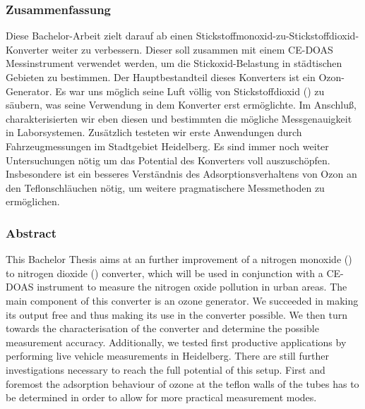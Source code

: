
\subsubsection*{Zusammenfassung}
\label{sec:Zusammenfassung}

Diese Bachelor-Arbeit zielt darauf ab einen
Stickstoffmonoxid-zu-Stickstoffdioxid-Konverter weiter zu
verbessern. Dieser soll zusammen mit einem CE-DOAS Messinstrument
verwendet werden, um die Stickoxid-Belastung in städtischen Gebieten
zu bestimmen. Der Hauptbestandteil dieses Konverters ist ein
Ozon-Generator. Es war uns möglich seine Luft völlig von
Stickstoffdioxid () zu säubern, was seine Verwendung in dem
Konverter erst ermöglichte. Im Anschluß, charakterisierten wir eben
diesen und bestimmten die mögliche  Messgenauigkeit in
Laborsystemen. Zusätzlich testeten wir erste Anwendungen durch
Fahrzeugmessungen im Stadtgebiet Heidelberg. Es sind immer noch weiter
Untersuchungen nötig um das Potential des Konverters voll
auszuschöpfen. Insbesondere ist ein besseres Verständnis des
Adsorptionsverhaltens von Ozon an den Teflonschläuchen nötig, um
weitere pragmatischere Messmethoden zu ermöglichen.


\subsubsection*{Abstract}
\label{sec:abstract}

This Bachelor Thesis aims at an further improvement of a nitrogen
monoxide () to nitrogen dioxide () converter, which
will be used in conjunction with a CE-DOAS instrument to measure the
nitrogen oxide pollution in urban areas. The main component of this
converter is an ozone generator. We succeeded in making its output
 free and thus making its use in the converter possible. We
then turn towards the characterisation of the converter and determine
the possible  measurement accuracy. Additionally, we tested
first productive applications by performing live vehicle measurements
in Heidelberg. There are still further investigations necessary to
reach the full potential of this setup. First and foremost the
adsorption behaviour of ozone at the teflon walls of the tubes has to
be determined in order to allow for more practical measurement modes.

